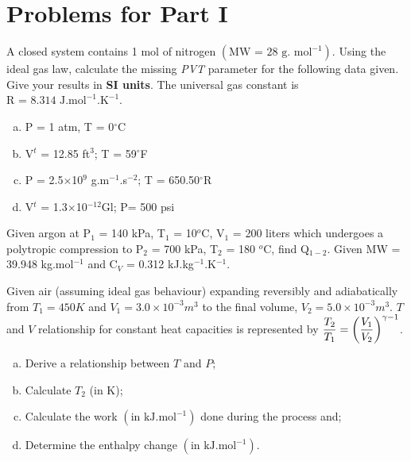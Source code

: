 \section{Problems for Part I}
\begin{MyTutorial}{}%
%
  \begin{problem}\label{Chapter:SecondLaw:Problem:01}
     A closed system contains 1 mol of nitrogen $\left(\text{MW = 28 g. mol}^{-1}\right)$. Using the ideal gas law, calculate the missing {\it PVT} parameter for the following data given. Give your results in {\bf SI units}. The universal gas constant is $\text{R = 8.314 J.mol}^{-1}\text{.K}^{-1}$.
     \begin{enumerate}[a)]   
       \item P = 1 atm, T = 0$^{\circ}$C
       \item V$^{t}$ = 12.85 ft$^{3}$; T = 59$^{\circ}$F
       \item P = 2.5$\times$10$^{9}$ g.m$^{-1}$.s$^{-2}$; T = 650.50$^{\circ}$R
       \item V$^{t}$ = 1.3$\times$10$^{-12}$Gl; P= 500 psi
    \end{enumerate}
  \end{problem}
%
  \begin{problem}\label{Tut01:FirstLawIdealGas1}
     Given argon at P$_{1}$ = 140 kPa, T$_{1}$ = 10$^{o}$C, V$_{1}$ = 200 liters which undergoes a polytropic compression to P$_{2}$ = 700 kPa, T$_{2}$ = 180 $^{o}$C, find Q$_{1-2}$. Given MW = 39.948 kg.mol$^{-1}$ and C$_{V}$ = 0.312 kJ.kg$^{-1}$.K$^{-1}$.
  \end{problem}
%
  \begin{problem}\label{Chapter:SecondLaw:Problem:02}
     Given air (assuming ideal gas behaviour) expanding reversibly and adiabatically from $T_{1}=450 K$ and $V_{1}=3.0\times 10^{-3}m^{3}$ to the final volume, $V_{2}=5.0\times 10^{-3}m^{3}$. $T$ and $V$ relationship for constant heat capacities is represented by $\displaystyle\displaystyle\frac{T_{2}}{T_{1}} = \left(\displaystyle\frac{V_{1}}{V_{2}}\right)^{\gamma-1}$.
     \begin{enumerate}[a)]  
        \item Derive a relationship between $T$ and $P$; 
        \item Calculate $T_{2}$ (in K);
        \item Calculate the work $\left(\text{in kJ.mol}^{-1}\right)$ done during the process and;
        \item Determine the enthalpy change $\left(\text{in kJ.mol}^{-1}\right)$.

\end{enumerate}
\end{problem}
\end{MyTutorial}

